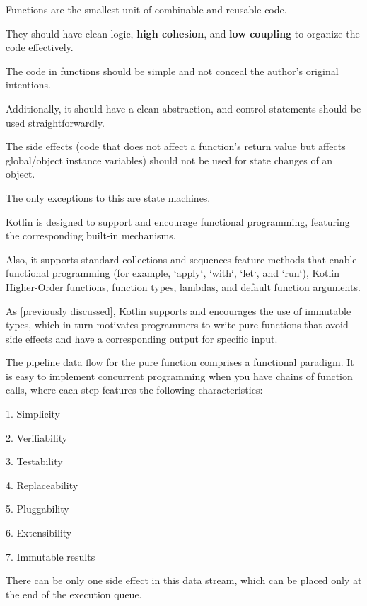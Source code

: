 {{{{Functions are the smallest unit of combinable and reusable code.

They should have clean logic, \textbf{high cohesion}, and \textbf{low coupling} to organize the code effectively.

The code in functions should be simple and not conceal the author's original intentions.



Additionally, it should have a clean abstraction, and control statements should be used straightforwardly.

The side effects (code that does not affect a function's return value but affects global/object instance variables) should not be used for state changes of an object.

The only exceptions to this are state machines.



Kotlin is \href{https://www.slideshare.net/abreslav/whos-more-functional-kotlin-groovy-scala-or-java}{designed} to support and encourage functional programming, featuring the corresponding built-in mechanisms.

Also, it supports standard collections and sequences feature methods that enable functional programming (for example, `apply`, `with`, `let`, and `run`), Kotlin Higher-Order functions, function types, lambdas, and default function arguments.

As [previously discussed], Kotlin supports and encourages the use of immutable types, which in turn motivates programmers to write pure functions that avoid side effects and have a corresponding output for specific input. 

The pipeline data flow for the pure function comprises a functional paradigm. It is easy to implement concurrent programming when you have chains of function calls, where each step features the following characteristics:

1.	Simplicity

2.	Verifiability

3.	Testability

4.	Replaceability

5.	Pluggability

6.	Extensibility

7.	Immutable results



There can be only one side effect in this data stream, which can be placed only at the end of the execution queue.



}}}}
